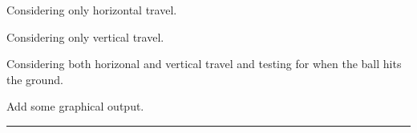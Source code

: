\documentclass{tufte-book} %
\begin{document}
\begin{description}[align=right]

\setlength{\itemindent}{-0.2in}

\item [Part I] Considering only horizontal travel.

\item [Part II] Considering only vertical travel.

\item [Part III] Considering both horizonal and vertical travel and testing for when the ball hits the ground.

\item [Part IV] Add some graphical output.

\end{description}

\vspace{-1mm}
\noindent\rule{4cm}{0.5pt}
\vspace{-2mm}
\end{document}
